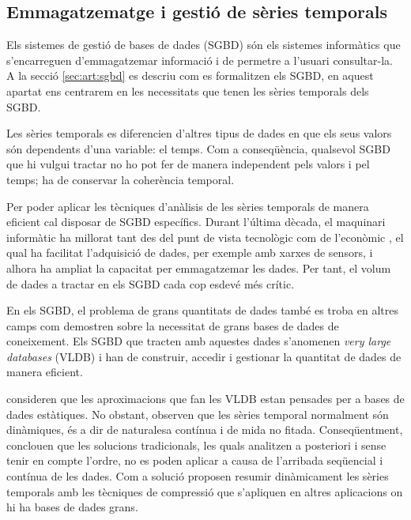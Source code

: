 \subsection{Emmagatzematge i gestió de sèries temporals}


Els sistemes de gestió de bases de dades (SGBD) són els sistemes informàtics que s'encarreguen d'emmagatzemar informació i de permetre a l'usuari consultar-la. A la secció \ref{sec:art:sgbd} es descriu com es formalitzen els SGBD, en aquest apartat ens centrarem en les necessitats que tenen les sèries temporals dels SGBD.


Les sèries temporals es diferencien d'altres tipus de dades en que els seus valors són dependents d'una variable: el temps. Com a conseqüència, qualsevol SGBD que hi vulgui tractar no ho pot fer de manera independent pels valors i pel temps; ha de conservar la coherència temporal.

Per poder aplicar les tècniques d'anàlisis de les sèries temporals de manera eficient cal disposar de SGBD específics. 
Durant l'última dècada, el maquinari informàtic ha millorat tant des del punt de vista tecnològic com de l'econòmic \parencite{deligiannakis07}, el qual ha facilitat l'adquisició de dades, per exemple amb xarxes de sensors, i alhora ha ampliat la capacitat per emmagatzemar les dades. 
Per tant, el volum de dades a tractar  en els SGBD cada cop esdevé més crític.

 
En els SGBD, el problema de grans quantitats de dades també es troba en altres camps com demostren \textcite{mylopoulos96} sobre la necessitat de grans bases de dades de coneixement. Els SGBD que tracten amb aquestes dades s'anomenen \emph{very large databases} (VLDB) i han de construir, accedir i gestionar la quantitat de dades de manera eficient.

\textcite{ogras06} consideren que les aproximacions que fan les VLDB
estan pensades per a bases de dades estàtiques. No obstant, observen
que les sèries temporal normalment són dinàmiques, és a dir de
naturalesa contínua i de mida no fitada. Conseqüentment, conclouen que
les solucions tradicionals, les quals analitzen a posteriori i sense
tenir en compte l'ordre, no es poden aplicar a causa de l'arribada
seqüencial i contínua de les dades.  Com a solució proposen resumir
dinàmicament les sèries temporals amb les tècniques de compressió que
s'apliquen en altres aplicacions on hi ha bases de dades grans.





